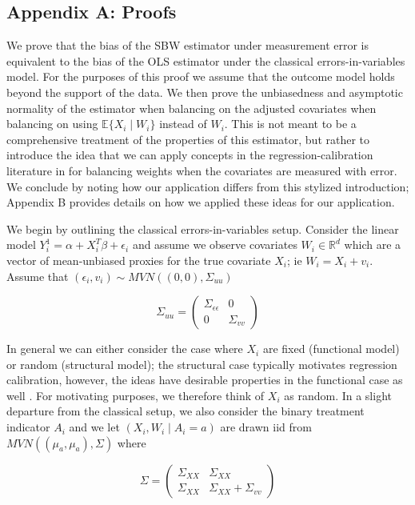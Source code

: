 \documentclass[12pt]{article}
\begin{document}
\subsection{Appendix A: Proofs}

We prove that the bias of the SBW estimator under measurement error is equivalent to the bias of the OLS estimator under the classical errors-in-variables model. For the purposes of this proof we assume that the outcome model holds beyond the support of the data. We then prove the unbiasedness and asymptotic normality of the estimator when balancing on the adjusted covariates when balancing on using $\mathbb{E}\{X_i \mid W_i\}$ instead of $W_i$. This is not meant to be a comprehensive treatment of the properties of this estimator, but rather to introduce the idea that we can apply concepts in the regression-calibration literature in for balancing weights when the covariates are measured with error. We conclude by noting how our application differs from this stylized introduction; Appendix B provides details on how we applied these ideas for our application.

We begin by outlining the classical errors-in-variables setup. Consider the linear model $Y_i^1 = \alpha + X_i^T\beta + \epsilon_i$ and assume we observe covariates $W_i \in \mathbb{R}^d$ which are a vector of mean-unbiased proxies for the true covariate $X_i$; ie $W_i = X_i + v_i$. Assume that $(\epsilon_i, v_i) \sim MVN((0,0), \Sigma_{uu})$ 

$$
\Sigma_{uu} = \begin{pmatrix} 
\Sigma_{\epsilon\epsilon} & 0 \\ 
0 & \Sigma_{vv} 
\end{pmatrix}
$$ 

In general we can either consider the case where $X_i$ are fixed (functional model) or random (structural model); the structural case typically motivates regression calibration, however, the ideas have desirable properties in the functional case as well \cite{gleser1992importance}. For motivating purposes, we therefore think of $X_i$ as random. In a slight departure from the classical setup, we also consider the binary treatment indicator $A_i$ and we let $(X_i, W_i \mid A_i = a)$ are drawn iid from $MVN((\mu_a, \mu_a), \Sigma)$ where 

$$
\Sigma = \begin{pmatrix} 
\Sigma_{XX} & \Sigma_{XX} \\ 
\Sigma_{XX} & \Sigma_{XX} + \Sigma_{vv} 
\end{pmatrix}
$$ 
\end{document}
